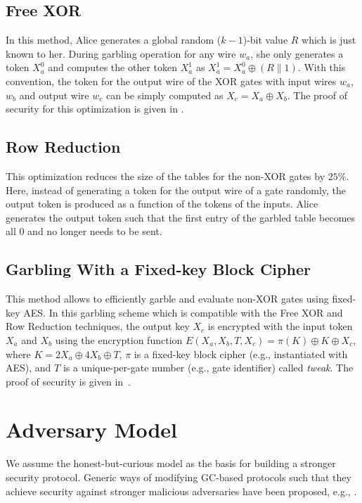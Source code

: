 \subsection{Free XOR~\cite{kolesnikov2008improved}}
In this method, Alice generates a global random ($k-1$)-bit value $R$ which is just known to her.
During garbling operation for any wire $w_a$, she only generates a token $X_a^{0}$ and computes the other token $X_a^{1}$ as $X_a^{1} = X_a^{0} \oplus (R \parallel 1)$.
With this convention, the token for the output wire of the XOR gates with input wires $w_{a}$, $w_{b}$ and output wire $w_{c}$ can be simply computed as $X_{c} = X_{a} \oplus X_{b}$.
The proof of security for this optimization is given in \cite{kolesnikov2008improved}.

\subsection{Row Reduction~\cite{naor1999privacy}}
This optimization reduces the size of the tables for the non-XOR gates by $25\%$.
Here, instead of generating a token for the output wire of a gate randomly, the output token is produced as a function of the tokens of the inputs.
Alice generates the output token such that the first entry of the garbled table becomes all $0$ and no longer needs to be sent.

\subsection{Garbling With a Fixed-key Block Cipher~\cite{bellare2013efficient}}
This method allows to efficiently garble and evaluate non-XOR gates using fixed-key AES.
In this garbling scheme which is compatible with the Free XOR and Row Reduction techniques, the output key $X_{c}$ is encrypted with the input token $X_{a}$ and $X_{b}$ using the encryption function $E(X_a,X_b,T,X_c) = \pi(K) \oplus K \oplus X_c$, where $K=2X_a\oplus4X_b\oplus T$, $\pi$ is a fixed-key block cipher (e.g., instantiated with AES), and $T$ is a unique-per-gate number (e.g., gate identifier) called \emph{tweak}.
The proof of security is given in~\cite{bellare2013efficient}.

\section{Adversary Model}
We assume the honest-but-curious model as the basis for building a stronger security protocol.
Generic ways of modifying GC-based protocols such that they achieve security against stronger malicious adversaries have been proposed, e.g., \cite{lindell2007efficient, lindell2012secure}.

